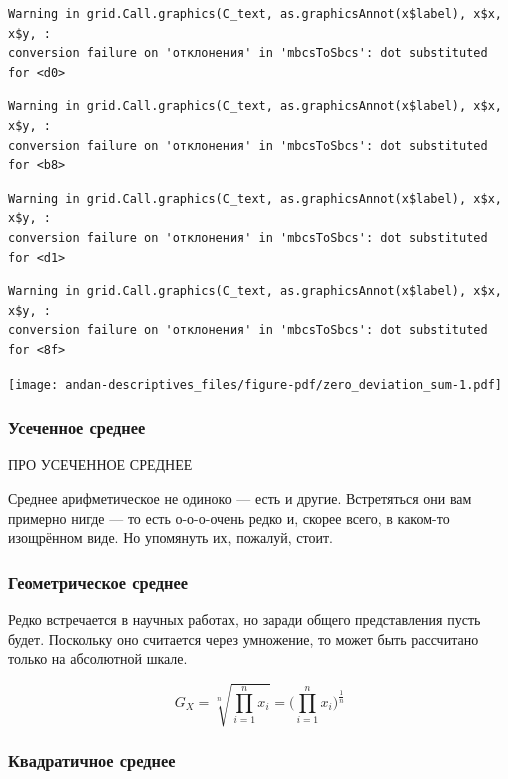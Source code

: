 \documentclass[
  letterpaper,
]{scrbook}
\theoremstyle{definition}
\theoremstyle{remark}
\begin{document}
\begin{verbatim}
Warning in grid.Call.graphics(C_text, as.graphicsAnnot(x$label), x$x, x$y, :
conversion failure on 'отклонения' in 'mbcsToSbcs': dot substituted for <d0>
\end{verbatim}

\begin{verbatim}
Warning in grid.Call.graphics(C_text, as.graphicsAnnot(x$label), x$x, x$y, :
conversion failure on 'отклонения' in 'mbcsToSbcs': dot substituted for <b8>
\end{verbatim}

\begin{verbatim}
Warning in grid.Call.graphics(C_text, as.graphicsAnnot(x$label), x$x, x$y, :
conversion failure on 'отклонения' in 'mbcsToSbcs': dot substituted for <d1>
\end{verbatim}

\begin{verbatim}
Warning in grid.Call.graphics(C_text, as.graphicsAnnot(x$label), x$x, x$y, :
conversion failure on 'отклонения' in 'mbcsToSbcs': dot substituted for <8f>
\end{verbatim}

\texttt{[image: andan-descriptives\_files/figure-pdf/zero\_deviation\_sum-1.pdf]}

\subsubsection{Усеченное среднее}\label{andan-descriptives-trimmed-mean}

ПРО УСЕЧЕННОЕ СРЕДНЕЕ

Среднее арифметическое не одиноко --- есть и другие. Встретяться они вам
примерно нигде --- то есть о-о-о-очень редко и, скорее всего, в каком-то
изощрённом виде. Но упомянуть их, пожалуй, стоит.

\subsubsection{Геометрическое
среднее}\label{andan-descriptives-geometric-mean}

Редко встречается в научных работах, но заради общего представления
пусть будет. Поскольку оно считается через умножение, то может быть
рассчитано только на абсолютной шкале.

\[
G_{X} = \sqrt[n]{\prod_{i=1}^n x_i} = \Big(\prod_{i=1}^n x_i\Big)^{\tfrac{1}{n}}
\]

\subsubsection{Квадратичное
среднее}\label{andan-descriptives-quandratic-mean}
\end{document}
